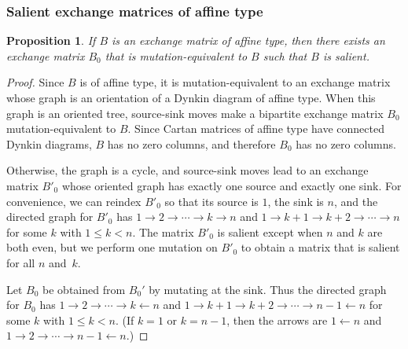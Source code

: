 \documentclass{amsart}
\newtheorem{proposition}{Proposition}[section]
\theoremstyle{definition}
\theoremstyle{remark}
\numberwithin{equation}{section}
\newcommand{\0}{{\mathbf{0}}}
\begin{document}
\subsubsection{Salient exchange matrices of affine type}
\begin{proposition}\label{affine salient}
If $B$ is an exchange matrix of affine type, then there exists an exchange matrix $B_0$ that is mutation-equivalent to $B$ such that $B$ is salient.
\end{proposition}
\begin{proof}
Since $B$ is of affine type, it is mutation-equivalent to an exchange matrix whose graph is an orientation of a Dynkin diagram of affine type.
When this graph is an oriented tree, source-sink moves make a bipartite exchange matrix $B_0$ mutation-equivalent to $B$.
Since Cartan matrices of affine type have connected Dynkin diagrams, $B$ has no zero columns, and therefore $B_0$ has no zero columns.

Otherwise, the graph is a cycle, and source-sink moves lead to an exchange matrix $B'_0$ whose oriented graph has exactly one source and exactly one sink.
For convenience, we can reindex $B'_0$ so that its source is $1$, the sink is $n$, and the directed graph for $B'_0$ has ${1\to2\to\cdots\to k\to n}$ and $1\to k+1\to k+2\to\cdots\to n$ for some $k$ with $1\le k<n$.
The matrix $B'_0$ is salient except when $n$ and $k$ are both even, but we perform one mutation on $B'_0$ to obtain a matrix that is salient for all $n$ and~$k$.

Let $B_0$ be obtained from $B_0'$ by mutating at the sink.
Thus the directed graph for $B_0$ has ${1\to2\to\cdots\to k\leftarrow n}$ and $1\to k+1\to k+2\to\cdots\to n-1\leftarrow n$ for some $k$ with $1\le k<n$.
(If $k=1$ or $k=n-1$, then the  arrows are $1\leftarrow n$ and $1\to2\to\cdots\to n-1\leftarrow n$.)


\end{proof}
\end{document}
